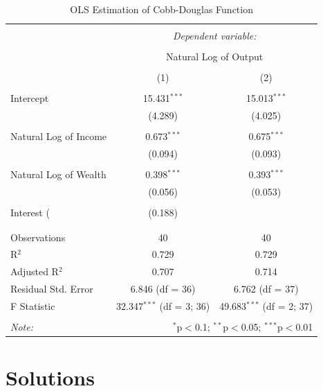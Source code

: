 \documentclass[
]{book}
\theoremstyle{definition}
\theoremstyle{definition}
\theoremstyle{definition}
\theoremstyle{definition}
\theoremstyle{remark}
\begin{document}
\begin{table}[!htbp] \centering 
  \caption{OLS Estimation of Cobb-Douglas Function} 
  \label{} 
\begin{tabular}{@{\extracolsep{5pt}}lcc} 
\\[-1.8ex]\hline 
\hline \\[-1.8ex] 
 & \multicolumn{2}{c}{\textit{Dependent variable:}} \\ 
\cline{2-3} 
\\[-1.8ex] & \multicolumn{2}{c}{Natural Log of Output} \\ 
\\[-1.8ex] & (1) & (2)\\ 
\hline \\[-1.8ex] 
 Intercept & 15.431$^{***}$ & 15.013$^{***}$ \\ 
  & (4.289) & (4.025) \\ 
  & & \\ 
 Natural Log of Income & 0.673$^{***}$ & 0.675$^{***}$ \\ 
  & (0.094) & (0.093) \\ 
  & & \\ 
 Natural Log of Wealth & 0.398$^{***}$ & 0.393$^{***}$ \\ 
  & (0.056) & (0.053) \\ 
  & & \\ 
 Interest (%
  & (0.188) &  \\ 
  & & \\ 
\hline \\[-1.8ex] 
Observations & 40 & 40 \\ 
R$^{2}$ & 0.729 & 0.729 \\ 
Adjusted R$^{2}$ & 0.707 & 0.714 \\ 
Residual Std. Error & 6.846 (df = 36) & 6.762 (df = 37) \\ 
F Statistic & 32.347$^{***}$ (df = 3; 36) & 49.683$^{***}$ (df = 2; 37) \\ 
\hline 
\hline \\[-1.8ex] 
\textit{Note:}  & \multicolumn{2}{r}{$^{*}$p$<$0.1; $^{**}$p$<$0.05; $^{***}$p$<$0.01} \\ 
\end{tabular} 
\end{table}

\hypertarget{solutions-1}{%
\section*{Solutions}\label{solutions-1}}
\end{document}
